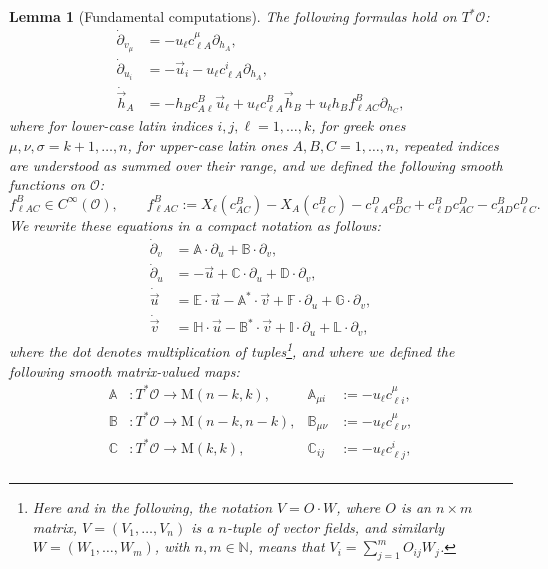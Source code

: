 \documentclass[10pt,a4paper]{amsart}
\newtheorem{lemma}{Lemma}
\newcommand{\A}{\mathbb{A}}
\newcommand{\B}{\mathbb{B}}
\newcommand{\C}{\mathbb{C}}
\newcommand{\D}{\mathbb{D}}
\newcommand{\E}{\mathbb{E}}
\newcommand{\F}{\mathbb{F}}
\newcommand{\G}{\mathbb{G}}
\renewcommand{\H}{\mathbb{H}}
\newcommand{\I}{\mathbb{I}}
\renewcommand{\L}{\mathbb{L}}
\newcommand{\N}{\mathbb{N}} %
\begin{document}
\begin{lemma}[Fundamental computations]\label{l:fundamentalcomputations}
The following formulas hold on $T^*\mathcal{O}$:
\begin{align}
\dot{\partial}_{v_\mu} & = -u_\ell c_{\ell A}^\mu \partial_{h_A},\\
\dot{\partial}_{u_i}  & = - \vec{u}_i - u_\ell c_{\ell A}^i \partial_{h_A},\\
\dot{{\vec{h}}}_{A}   &  =  - h_B c_{A \ell}^B \vec{u}_\ell +u_\ell c_{\ell A}^B \vec{h}_B + u_\ell h_B f_{\ell A C}^B \partial_{h_C},
\end{align}
where for lower-case latin indices $i,j,\ell=1,\dots,k$, for greek ones $\mu,\nu,\sigma=k+1,\dots,n$, for upper-case latin ones $A,B,C=1,\dots,n$, repeated indices are understood as summed over their range, and we defined the following smooth functions on $\mathcal{O}$:
\begin{equation}
f_{\ell A C}^B\in C^\infty(\mathcal{O}),\qquad f_{\ell A C}^B := X_\ell(c_{AC}^B) - X_A(c_{\ell C}^B) - c_{\ell A}^D c_{DC}^B +c_{\ell D}^B c_{AC}^D-c_{AD}^B  c_{\ell C}^D.
\end{equation}
We rewrite these equations in a compact notation as follows:\begin{align}
\dot{\partial}_v & = \A \cdot \partial_u + \B \cdot \partial_v, \label{eq:partialvdot}\\
\dot{\partial}_u & = -\vec{u} + \C \cdot \partial_u + \D \cdot \partial_v, \label{eq:partialudot}\\
\dot{\vec{u}} & =  \E \cdot \vec{u} -\A^* \cdot \vec{v} + \F \cdot \partial_u + \G \cdot \partial_v, \label{eq:vecudot} \\ 
\dot{\vec{v}} & = \H \cdot \vec{u}  -\B^* \cdot \vec{v} + \I \cdot \partial_u + \L \cdot \partial_v, \label{eq:vecvdot}
\end{align}
where the dot denotes multiplication of tuples\footnote{Here and in the following, the notation $V = O\cdot W$, where $O$ is an $n\times m$ matrix, $V=(V_1,\dots,V_n)$ is a $n$-tuple of vector fields, and similarly $W=(W_1,\dots,W_m)$, with $n,m \in \N$, means that $V_i = \sum_{j=1}^m O_{ij} W_j$.}, and where we defined the following smooth matrix-valued maps:
\begin{align}
\A & : T^*\mathcal{O} \to \mathrm{M}(n-k, k), & \A_{\mu i} & := - u_\ell c_{\ell i}^\mu,  \\
\B & : T^*\mathcal{O} \to \mathrm{M}(n-k, n-k), & \B_{\mu \nu} & := - u_\ell c_{\ell\nu}^\mu,\\
\C & : T^*\mathcal{O} \to \mathrm{M}(k, k), & \C_{i j} & := - u_\ell c_{\ell j}^i, \\

\end{align}
\end{lemma}
\end{document}

